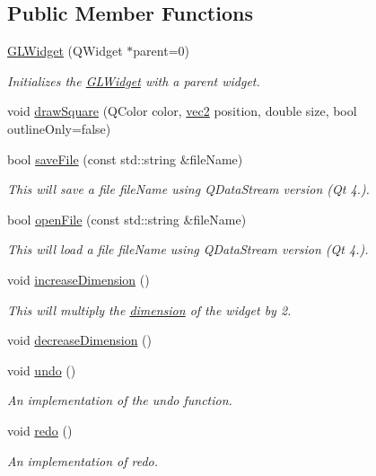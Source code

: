 \subsection*{Public Member Functions}
\begin{DoxyCompactItemize}
\item 
\hyperlink{classGLWidget_ab79c391c86de1ffb76f6950b49d82c0c}{G\-L\-Widget} (Q\-Widget $\ast$parent=0)
\begin{DoxyCompactList}\small\item\em Initializes the \hyperlink{classGLWidget}{G\-L\-Widget} with a parent widget. \end{DoxyCompactList}\item 
void \hyperlink{classGLWidget_a6e0dab354b3abec59774c29f82346ebe}{draw\-Square} (Q\-Color color, \hyperlink{classvec2}{vec2} position, double size, bool outline\-Only=false)
\item 
bool \hyperlink{classGLWidget_aebdd7462523ecff734ac224031ec9e0b}{save\-File} (const std\-::string \&file\-Name)
\begin{DoxyCompactList}\small\item\em This will save a file {\ttfamily file\-Name} using Q\-Data\-Stream version (Qt 4.). \end{DoxyCompactList}\item 
bool \hyperlink{classGLWidget_a7c2c4eee95553aad627843b865d3bc23}{open\-File} (const std\-::string \&file\-Name)
\begin{DoxyCompactList}\small\item\em This will load a file {\ttfamily file\-Name} using Q\-Data\-Stream version (Qt 4.). \end{DoxyCompactList}\item 
void \hyperlink{classGLWidget_a603764586aa51ed3fbdd06ac9c658e6b}{increase\-Dimension} ()
\begin{DoxyCompactList}\small\item\em This will multiply the \hyperlink{classGLWidget_a0ecdf8ea93e62ab9d294714e59dafd64}{dimension} of the widget by 2. \end{DoxyCompactList}\item 
void \hyperlink{classGLWidget_a34c77d5e886569ec84123bb0da5a0751}{decrease\-Dimension} ()
\item 
void \hyperlink{classGLWidget_aed44b9ce42449cf8f086a743bbbac7cd}{undo} ()
\begin{DoxyCompactList}\small\item\em An implementation of the undo function. \end{DoxyCompactList}\item 
void \hyperlink{classGLWidget_a5371a80ec723e710374f302611710e15}{redo} ()
\begin{DoxyCompactList}\small\item\em An implementation of redo. \end{DoxyCompactList}\end{DoxyCompactItemize}
